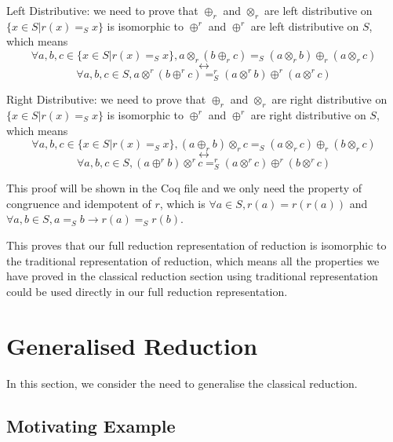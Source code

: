 \documentclass[a4paper,12pt,twoside,openright]{report}
\begin{document}
Left Distributive: we need to prove that $\oplus_r$ and $\otimes_r$ are left distributive on $\{x \in S | r(x) =_S x\}$ is isomorphic to $\oplus^r$ and $\oplus^r$ are left distributive on $S$, which means 
\[\forall a,b,c \in \{x \in S | r(x) =_S x \}, a \otimes_r (b \oplus_r c) =_S (a \otimes_r b) \oplus_r (a \otimes_r c) \]
\[\longleftrightarrow \]
\[\forall a,b,c \in S, a \otimes^r (b \oplus^r c) =^r_S (a \otimes^r b) \oplus^r (a \otimes^r c)
\]

Right Distributive: we need to prove that $\oplus_r$ and $\otimes_r$ are right distributive on $\{x \in S | r(x) =_S x\}$ is isomorphic to $\oplus^r$ and $\oplus^r$ are right distributive on $S$, which means 
\[\forall a,b,c \in \{x \in S | r(x) =_S x \}, (a \oplus_r b) \otimes_r c =_S (a \otimes_r c) \oplus_r (b \otimes_r c) \]
\[\longleftrightarrow \]
\[\forall a,b,c \in S, (a \oplus^r b) \otimes^r c =^r_S (a \otimes^r c) \oplus^r (b \otimes^r c)
\]

This proof will be shown in the Coq \cite{Coq} file and we only need the property of congruence and idempotent of $r$, which is $\forall a \in S, r(a) = r(r(a))$ and $\forall a,b \in S, a =_S b \rightarrow r(a) =_S r(b)$.

This proves that our full reduction representation of reduction is isomorphic to the traditional representation of reduction, which means all the properties we have proved in the classical reduction section using traditional representation could be used directly in our full reduction representation.


\section{Generalised Reduction}
In this section, we consider the need to generalise the classical reduction.
\subsection{Motivating Example}
\end{document}
